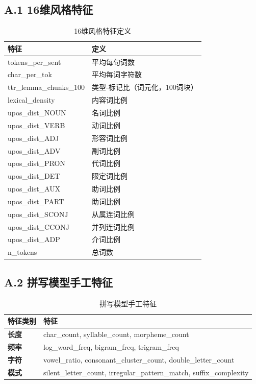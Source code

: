 \documentclass[11pt,a4paper]{article}
\begin{document}
\subsection*{A.1 16维风格特征}

\begin{table}[h]
\centering
\small
\begin{tabular}{ll}
\toprule
\textbf{特征} & \textbf{定义} \\
\midrule
tokens\_per\_sent & 平均每句词数 \\
char\_per\_tok & 平均每词字符数 \\
ttr\_lemma\_chunks\_100 & 类型-标记比（词元化，100词块） \\
lexical\_density & 内容词比例 \\
upos\_dist\_NOUN & 名词比例 \\
upos\_dist\_VERB & 动词比例 \\
upos\_dist\_ADJ & 形容词比例 \\
upos\_dist\_ADV & 副词比例 \\
upos\_dist\_PRON & 代词比例 \\
upos\_dist\_DET & 限定词比例 \\
upos\_dist\_AUX & 助词比例 \\
upos\_dist\_PART & 助词比例 \\
upos\_dist\_SCONJ & 从属连词比例 \\
upos\_dist\_CCONJ & 并列连词比例 \\
upos\_dist\_ADP & 介词比例 \\
n\_tokens & 总词数 \\
\bottomrule
\end{tabular}
\caption{16维风格特征定义}
\label{tab:features_def}
\end{table}

\subsection*{A.2 拼写模型手工特征}

\begin{table}[h]
\centering
\begin{tabular}{ll}
\toprule
\textbf{特征类别} & \textbf{特征} \\
\midrule
\textbf{长度} & char\_count, syllable\_count, morpheme\_count \\
\textbf{频率} & log\_word\_freq, bigram\_freq, trigram\_freq \\
\textbf{字符} & vowel\_ratio, consonant\_cluster\_count, double\_letter\_count \\
\textbf{模式} & silent\_letter\_count, irregular\_pattern\_match, suffix\_complexity \\
\bottomrule
\end{tabular}
\caption{拼写模型手工特征}
\label{tab:handcrafted_features}
\end{table}
\end{document}
